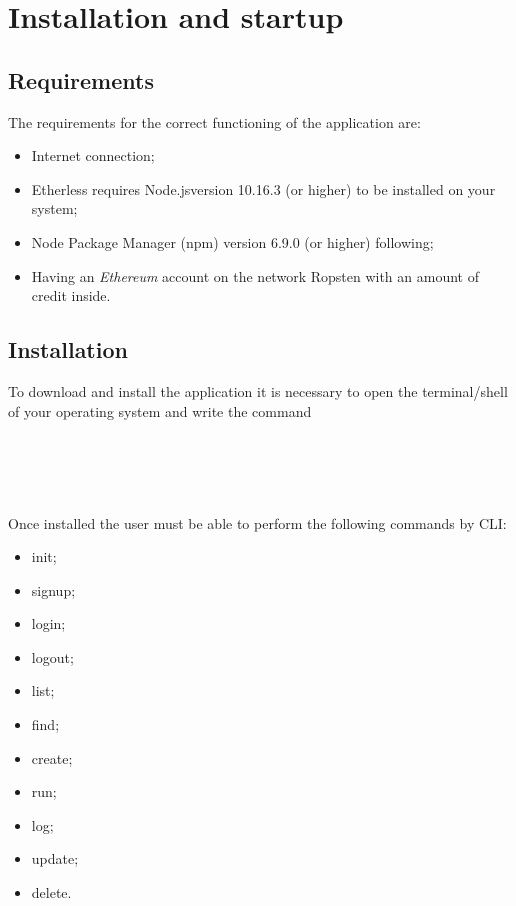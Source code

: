 \section{Installation and startup}
\subsection{Requirements}
The requirements for the correct functioning of the application are:
\begin{itemize}
	\item Internet connection;
	\item Etherless requires Node.js\glo version 10.16.3 (or higher) to be installed on your system;
	\item Node Package Manager (npm) version 6.9.0 (or higher) following;
	\item Having an \textit{Ethereum\glo} account on the network Ropsten with an amount of credit inside.
\end{itemize}
\subsection{Installation}
To download and install the application it is necessary to open the terminal/shell of your operating system and write the command \\
\\
\centerline{}\\
\\
\\
Once installed the user must be able to perform the following commands by CLI\glo: 
\begin{itemize}
	\item init;
	\item signup;
	\item login;
	\item logout;
	\item list;
	\item find;
	\item create;
	\item run;
	\item log;
	\item update;
	\item delete.

\end{itemize}